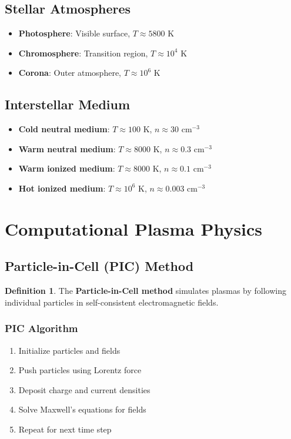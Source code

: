 \documentclass[11pt]{article}
\theoremstyle{definition}
\newtheorem{definition}{Definition}[section]
\begin{document}
\subsection{Stellar Atmospheres}
\begin{itemize}
    \item \textbf{Photosphere}: Visible surface, $T \approx 5800$ K
    \item \textbf{Chromosphere}: Transition region, $T \approx 10^4$ K
    \item \textbf{Corona}: Outer atmosphere, $T \approx 10^6$ K
\end{itemize}

\subsection{Interstellar Medium}
\begin{itemize}
    \item \textbf{Cold neutral medium}: $T \approx 100$ K, $n \approx 30$ cm$^{-3}$
    \item \textbf{Warm neutral medium}: $T \approx 8000$ K, $n \approx 0.3$ cm$^{-3}$
    \item \textbf{Warm ionized medium}: $T \approx 8000$ K, $n \approx 0.1$ cm$^{-3}$
    \item \textbf{Hot ionized medium}: $T \approx 10^6$ K, $n \approx 0.003$ cm$^{-3}$
\end{itemize}

\section{Computational Plasma Physics}

\subsection{Particle-in-Cell (PIC) Method}
\begin{definition}
The \textbf{Particle-in-Cell method} simulates plasmas by following individual particles in self-consistent electromagnetic fields.
\end{definition}

\subsubsection{PIC Algorithm}
\begin{enumerate}
    \item Initialize particles and fields
    \item Push particles using Lorentz force
    \item Deposit charge and current densities
    \item Solve Maxwell's equations for fields
    \item Repeat for next time step
\end{enumerate}
\end{document}

